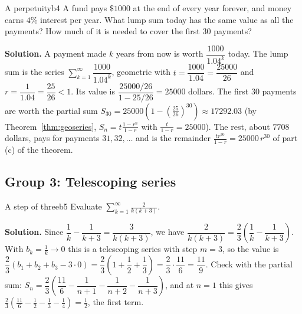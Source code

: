 \documentclass[11pt]{article}
\begin{document}
\begin{exmp}{A perpetuity}{b4}
A fund pays $\$1000$ at the end of every year forever, and money earns $4\%$ interest per year. What lump sum today has the same value as all the payments? How much of it is needed to cover the first $30$ payments?

\textbf{Solution.} A payment made $k$ years from now is worth $\dfrac{1000}{1.04^k}$ today. The lump sum is the series $\sum_{k=1}^\infty\dfrac{1000}{1.04^k}$, geometric with $t=\dfrac{1000}{1.04}=\dfrac{25000}{26}$ and $r=\dfrac1{1.04}=\dfrac{25}{26}<1$. Its value is $\dfrac{25000/26}{1-25/26}=25000$ dollars. The first $30$ payments are worth the partial sum $S_{30}=25000\left(1-\left(\frac{25}{26}\right)^{30}\right)\approx17292.03$ (by Theorem~\ref{thm:geoseries}, $S_n=t\frac{1-r^n}{1-r}$ with $\frac t{1-r}=25000$). The rest, about $7708$ dollars, pays for payments $31, 32,\dots$ and is the remainder $\frac{tr^{30}}{1-r}=25000\,r^{30}$ of part (c) of the theorem.
\end{exmp}

\subsection*{Group 3: Telescoping series}

\begin{exmp}{A step of three}{b5}
Evaluate $\displaystyle\sum_{k=1}^\infty\frac2{k(k+3)}$.

\textbf{Solution.} Since $\dfrac1k-\dfrac1{k+3}=\dfrac3{k(k+3)}$, we have $\dfrac2{k(k+3)}=\dfrac23\left(\dfrac1k-\dfrac1{k+3}\right)$. With $b_k=\frac1k\to0$ this is a telescoping series with step $m=3$, so the value is $\dfrac23\left(b_1+b_2+b_3-3\cdot0\right)=\dfrac23\left(1+\dfrac12+\dfrac13\right)=\dfrac23\cdot\dfrac{11}6=\dfrac{11}9$. Check with the partial sum: $S_n=\dfrac23\left(\dfrac{11}6-\dfrac1{n+1}-\dfrac1{n+2}-\dfrac1{n+3}\right)$, and at $n=1$ this gives $\frac23\left(\frac{11}6-\frac12-\frac13-\frac14\right)=\frac12$, the first term.
\end{exmp}
\end{document}
